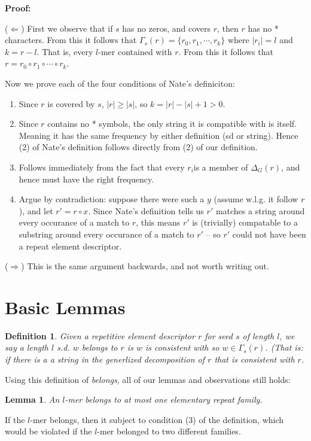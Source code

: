 \documentclass{article}
\newtheorem{definition}{Definition}
\newtheorem{lemma}{Lemma}
\begin{document}
{\bf Proof:}

($\Leftarrow$) First we observe that if $s$ has no zeros, and covers
$r$, then $r$ has no * characters.  From this it follows that
$\Gamma_s(r) = \{r_0,r_1,\cdots,r_{k}\}$ where $|r_i|=l$ and $k=r-l$.
That is, every $l$-mer contained with $r$.  From this it follows that $r = r_0 \circ
r_1 \circ \cdots \circ r_k$.


Now we prove each of the four conditions of Nate's definiciton:
\begin{enumerate}
  \item Since $r$ is covered by $s$, $|r| \geq |s|$, so $k =
    |r|-|s|+1 > 0$.
  \item Since $r$ contains no * symbols, the only string it
    is compatible with is itself.  Meaning it has the same frequency by
    either definition (sd or string).  Hence (2) of Nate's
    definition follows directly from (2) of our definition.
  \item Follows immediately from the fact that every $r_i$is a
    member of $\Delta_G(r)$, and hence must have the right frequency.
   \item Argue by contradiction: suppose there were such a $y$ (assume
     w.l.g. it follow $r$), and let $r' = r \circ x$.  Since Nate's
     definition tells us $r'$ matches a string around every occurance
     of a match to $r$, this means $r'$ is (trivially) compatable to a
     substring around every occurance of a match to $r'$ -- so $r'$
     could not have been a repeat element descriptor.
\end{enumerate}

($\Rightarrow$) This is the same argument backwards, and not worth
writing out.

\section{Basic Lemmas}

\begin{definition}
  Given a repetitive element descriptor $r$ for seed $s$ of length
  $l$, we say a length $l$ s.d. $w$ belongs to $r$ is $w$ is
  consistent with so $w \in 
  \Gamma_s(r)$.  (That is: if there is a a string in the generlized
  decomposition of $r$ that is consistent with $r$.
\end{definition}


Using this definition of {\it belongs}, all of our lemmas and
observations still holds:
\begin{lemma}
  An $l$-mer belongs to at most one elementary repeat family.
\end{lemma}
If the $l$-mer belongs, then it subject to condition (3) of the
definition, which would be violated if the $l$-mer belonged to two
different families.
\end{document}
